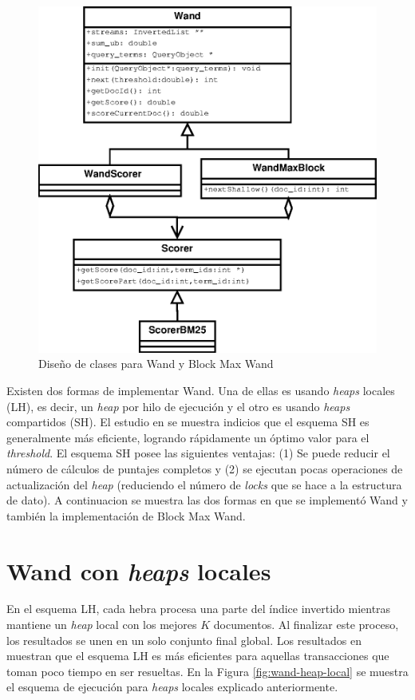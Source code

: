 \begin{figure}[!th]
\centering
\includegraphics[scale=.75]{images/WAND.eps}
\caption{Diseño de clases para Wand y Block Max Wand}
\label{fig:diagramawand}
\end{figure}

Existen dos formas de implementar Wand. Una de ellas es usando \textit{heaps} locales (LH), es decir, un \textit{heap} por hilo de ejecución y el otro es usando \textit{heaps} compartidos (SH). El estudio en \citep{Rojas:2013} se muestra indicios que el esquema SH es generalmente más eficiente, logrando rápidamente un óptimo valor para el \textit{threshold}. El esquema SH posee las siguientes ventajas: (1) Se puede reducir el número de cálculos de puntajes completos y (2) se ejecutan pocas operaciones de actualización del \textit{heap} (reduciendo el número de \textit{locks} que se hace a la estructura de dato). 
A continuacion se muestra las dos formas en que se implementó Wand y también la implementación de Block Max Wand.


\section{Wand con \textit{heaps} locales}
\label{scheduling:wlh}
En el esquema LH, cada hebra procesa una parte del índice invertido mientras mantiene un \textit{heap} local con los mejores $K$ documentos. Al finalizar este proceso, los resultados se unen en un solo conjunto final global. Los resultados en \citep{Rojas:2013} muestran que el esquema LH es más eficientes para aquellas transacciones que toman poco tiempo en ser resueltas. En la Figura \ref{fig:wand-heap-local} se muestra el esquema de ejecución para \textit{heaps} locales explicado anteriormente. 

